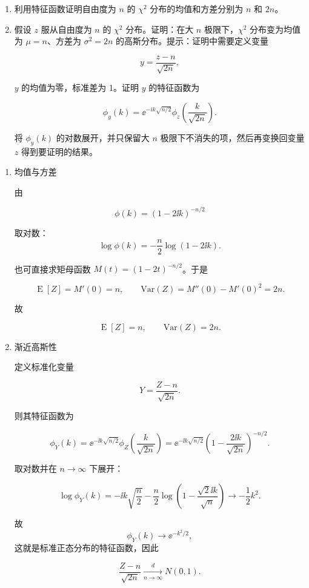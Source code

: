 \begin{question}
\begin{enumerate}
\item 利用特征函数证明自由度为 \(n\) 的 \(\chi^2\) 分布的均值和方差分别为
\(n\) 和 \(2n\)。

\item 假设 \(z\) 服从自由度为 \(n\) 的 \(\chi^2\) 分布。证明：在大 \(n\)
极限下，\(\chi^2\) 分布变为均值为 \(\mu=n\)、方差为 \(\sigma^2=2n\)
的高斯分布。提示：证明中需要定义变量

\[
y=\frac{z-n}{\sqrt{2n}},
\]

\(y\) 的均值为零，标准差为 1。证明 \(y\) 的特征函数为

\[
\phi_y(k)=\ee^{-ik\sqrt{n/2}}\phi_z\left(\frac{k}{\sqrt{2n}}\right).
\]

将 \(\phi_y(k)\) 的对数展开，并只保留大 \(n\)
极限下不消失的项，然后再变换回变量 \(z\) 得到要证明的结果。
\end{enumerate}
\begin{solution}
\begin{enumerate}
\item 均值与方差

由

\[
\phi(k)=(1-2\ii k)^{-n/2}
\]

取对数： \[
\log \phi(k)=-\frac n2 \log(1-2\ii k).
\]

也可直接求矩母函数 \(M(t)=(1-2t)^{-n/2}\)。于是

\[
\operatorname{E}[Z]=M'(0)=n,\qquad \mathrm{Var}(Z)=M''(0)-M'(0)^2=2n.
\]

故

\[
\operatorname{E}[Z]=n,\qquad \mathrm{Var}(Z)=2n.
\]

\item 渐近高斯性

定义标准化变量

\[
Y=\frac{Z-n}{\sqrt{2n}}.
\]

则其特征函数为

\[
\phi_Y(k)=\ee^{-\ii k\sqrt{n/2}}\phi_Z\!\left(\frac{k}{\sqrt{2n}}\right)
=\ee^{-\ii k\sqrt{n/2}}\left(1-\frac{2\ii k}{\sqrt{2n}}\right)^{-n/2}.
\]

取对数并在 \(n\to\infty\) 下展开：

\[
\log\phi_Y(k)
=
-\ii k\sqrt{\frac n2}
-\frac n2 \log\!\left(1-\frac{\sqrt{2}\ii k}{\sqrt n}\right)
\to -\frac12 k^2.
\]

故 \[
\phi_Y(k)\to \ee^{-k^2/2},
\] 这就是标准正态分布的特征函数，因此

\[
\frac{Z-n}{\sqrt{2n}}\xrightarrow[n\to\infty]{d}N(0,1).
\]
\end{enumerate}
\end{solution}
\end{question}


